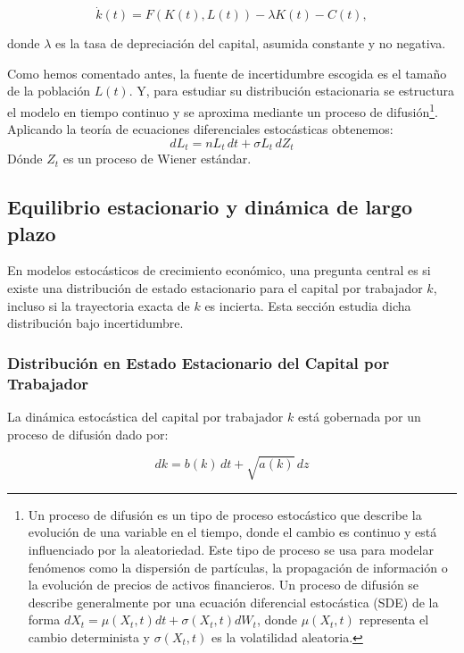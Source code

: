 \documentclass[a4paper,12pt]{article}
\begin{document}
		\begin{equation}
			\dot{k}(t) = F(K(t), L(t)) - \lambda K(t) - C(t),
		\end{equation}
		
		donde \( \lambda \) es la tasa de depreciación del capital, asumida constante y no negativa.
		
		Como hemos comentado antes, la fuente de incertidumbre escogida es el tamaño de la población \( L(t) \). Y, para estudiar su distribución estacionaria se estructura el modelo en tiempo continuo y se aproxima mediante un proceso de difusión\footnote{Un proceso de difusión es un tipo de proceso estocástico que describe la evolución de una variable en el tiempo, donde el cambio es continuo y está influenciado por la aleatoriedad. Este tipo de proceso se usa para modelar fenómenos como la dispersión de partículas, la propagación de información o la evolución de precios de activos financieros. Un proceso de difusión se describe generalmente por una ecuación diferencial estocástica (SDE) de la forma \( dX_t = \mu(X_t, t)dt + \sigma(X_t, t)dW_t \), donde \( \mu(X_t, t) \) representa el cambio determinista y \( \sigma(X_t, t) \) es la volatilidad aleatoria.}.
		Aplicando la teoría de ecuaciones diferenciales estocásticas obtenemos:
		\begin{equation}
		dL_t = nL_t \, dt + \sigma L_t \, dZ_t
		\end{equation}
		Dónde \( Z_t \) es un proceso de Wiener estándar.
		

	\subsection{Equilibrio estacionario y dinámica de largo plazo}
		En modelos estocásticos de crecimiento económico, una pregunta central es si existe una distribución de estado estacionario para el capital por trabajador \( k \), incluso si la trayectoria exacta de \( k \) es incierta. Esta sección estudia dicha distribución bajo incertidumbre.
			
		\subsubsection{Distribución en Estado Estacionario del Capital por Trabajador}
		
		La dinámica estocástica del capital por trabajador \( k \) está gobernada por un proceso de difusión dado por:
		
\begin{equation}
dk = b(k)\,dt + \sqrt{a(k)}\,dz
\end{equation}
		
\end{document}

